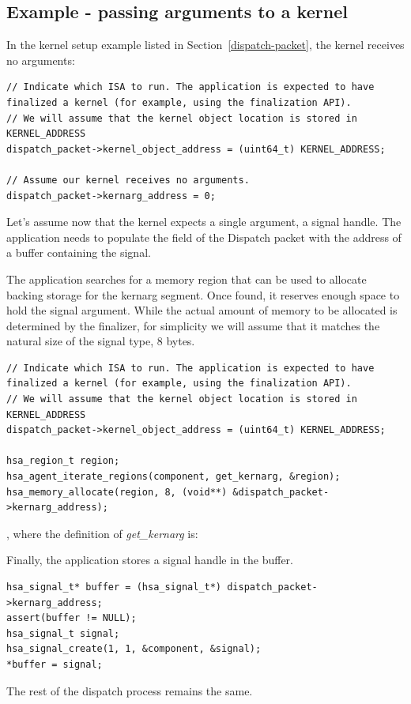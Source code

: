 \documentclass[final,oneside]{book}
\begin{document}
\subsection{Example - passing arguments to a kernel}\label{ex:kernarg_dispatch}
In the kernel setup example listed in Section~\ref{dispatch-packet}, the kernel
receives no arguments:
\begin{lstlisting}
// Indicate which ISA to run. The application is expected to have finalized a kernel (for example, using the finalization API).
// We will assume that the kernel object location is stored in KERNEL_ADDRESS
dispatch_packet->kernel_object_address = (uint64_t) KERNEL_ADDRESS;

// Assume our kernel receives no arguments.
dispatch_packet->kernarg_address = 0;
\end{lstlisting}
Let's assume now that the kernel expects a single argument, a signal handle. The
application needs to populate the 
field of the Dispatch packet with the address of a buffer containing the signal.

The application searches for a memory region that can be used to allocate
backing storage for the kernarg segment. Once found, it reserves enough space to
hold the signal argument. While the actual amount of memory to be allocated is
determined by the finalizer, for simplicity we will assume that it matches the
natural size of the signal type, 8 bytes.
\begin{lstlisting}
// Indicate which ISA to run. The application is expected to have finalized a kernel (for example, using the finalization API).
// We will assume that the kernel object location is stored in KERNEL_ADDRESS
dispatch_packet->kernel_object_address = (uint64_t) KERNEL_ADDRESS;

hsa_region_t region;
hsa_agent_iterate_regions(component, get_kernarg, &region);
hsa_memory_allocate(region, 8, (void**) &dispatch_packet->kernarg_address);
\end{lstlisting}

, where the definition of \textit{get_kernarg} is:


Finally, the application stores a signal handle in the buffer.
\begin{lstlisting}
hsa_signal_t* buffer = (hsa_signal_t*) dispatch_packet->kernarg_address;
assert(buffer != NULL);
hsa_signal_t signal;
hsa_signal_create(1, 1, &component, &signal);
*buffer = signal;
\end{lstlisting}
The rest of the dispatch process remains the same.
\end{document}
